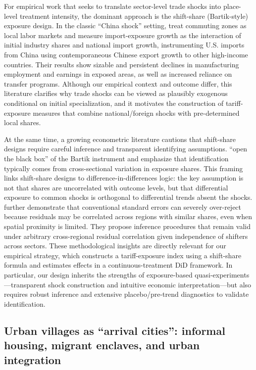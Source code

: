 For empirical work that seeks to translate sector-level trade shocks into place-level treatment intensity, the dominant approach is the shift-share (Bartik-style) exposure design. In the classic ``China shock'' setting, \citet{autor2013china} treat commuting zones as local labor markets and measure import-exposure growth as the interaction of initial industry shares and national import growth, instrumenting U.S. imports from China using contemporaneous Chinese export growth to other high-income countries. Their results show sizable and persistent declines in manufacturing employment and earnings in exposed areas, as well as increased reliance on transfer programs. Although our empirical context and outcome differ, this literature clarifies why trade shocks can be viewed as plausibly exogenous conditional on initial specialization, and it motivates the construction of tariff-exposure measures that combine national/foreign shocks with pre-determined local shares.

At the same time, a growing econometric literature cautions that shift-share designs require careful inference and transparent identifying assumptions. \citet{goldsmithpinkham2020bartik} ``open the black box'' of the Bartik instrument and emphasize that identification typically comes from cross-sectional variation in exposure shares. This framing links shift-share designs to difference-in-differences logic: the key assumption is not that shares are uncorrelated with outcome levels, but that differential exposure to common shocks is orthogonal to differential trends absent the shocks. \citet{adao2019shiftshare} further demonstrate that conventional standard errors can severely over-reject because residuals may be correlated across regions with similar shares, even when spatial proximity is limited. They propose inference procedures that remain valid under arbitrary cross-regional residual correlation given independence of shifters across sectors. These methodological insights are directly relevant for our empirical strategy, which constructs a tariff-exposure index using a shift-share formula and estimates effects in a continuous-treatment DiD framework. In particular, our design inherits the strengths of exposure-based quasi-experiments---transparent shock construction and intuitive economic interpretation---but also requires robust inference and extensive placebo/pre-trend diagnostics to validate identification.

\subsection{Urban villages as ``arrival cities'': informal housing, migrant enclaves, and urban integration}
\label{subsec:arrival_city}

